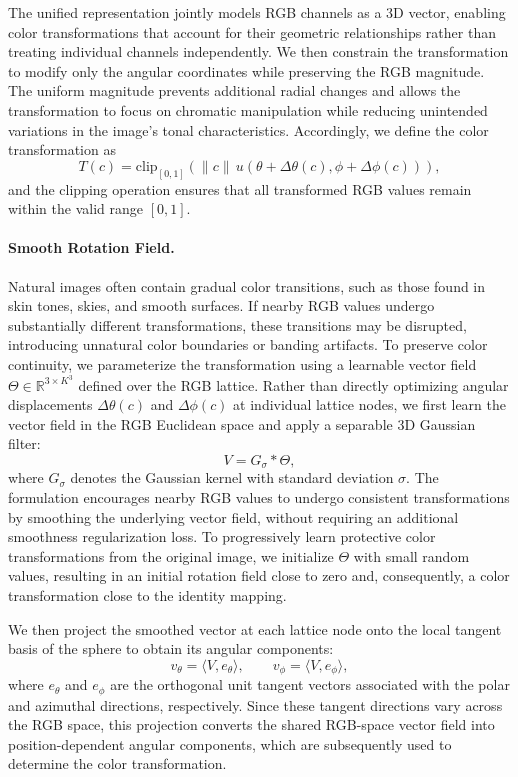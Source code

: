 The unified representation jointly models RGB channels as a 3D vector, enabling color transformations that account for their geometric relationships rather than treating individual channels independently. We then constrain the transformation to modify only the angular coordinates while preserving the RGB magnitude. The uniform magnitude prevents additional radial changes and allows the transformation to focus on chromatic manipulation while reducing unintended variations in the image's tonal characteristics. Accordingly, we define the color transformation as
\begin{equation}
T(c)=\mathrm{clip}_{[0,1]}
\left(
\|c\|\,u(
\theta+\Delta\theta(c),
\phi+\Delta\phi(c))
\right),
\label{eq:rotation}
\end{equation}
and the clipping operation ensures that all transformed RGB values remain within the valid range $[0,1]$.

\paragraph{Smooth Rotation Field.}
Natural images often contain gradual color transitions, such as those found in skin tones, skies, and smooth surfaces. If nearby RGB values undergo substantially different transformations, these transitions may be disrupted, introducing unnatural color boundaries or banding artifacts. To preserve color continuity, we parameterize the transformation using a learnable vector field $\Theta\in\mathbb{R}^{3\times K^3}$ defined over the RGB lattice. Rather than directly optimizing angular displacements $\Delta\theta(c)$ and $\Delta\phi(c)$ at individual lattice nodes, we first learn the vector field in the RGB Euclidean space and apply a separable 3D Gaussian filter:
\begin{equation}
V=G_\sigma * \Theta,
\label{eq:field}
\end{equation}
where $G_\sigma$ denotes the Gaussian kernel with standard deviation $\sigma$. The formulation encourages nearby RGB values to undergo consistent transformations by smoothing the underlying vector field, without requiring an additional smoothness regularization loss. To progressively learn protective color transformations from the original image, we initialize $\Theta$ with small random values, resulting in an initial rotation field close to zero and, consequently, a color transformation close to the identity mapping. 

We then project the smoothed vector at each lattice node onto the local tangent basis of the sphere to obtain its angular components:
\begin{equation}
v_\theta=\langle V,e_\theta\rangle,\qquad
v_\phi=\langle V,e_\phi\rangle,
\label{eq:tangent}
\end{equation}
where $e_\theta$ and $e_\phi$ are the orthogonal unit tangent vectors associated with the polar and azimuthal directions, respectively. Since these tangent directions vary across the RGB space, this projection converts the shared RGB-space vector field into position-dependent angular components, which are subsequently used to determine the color transformation. 

